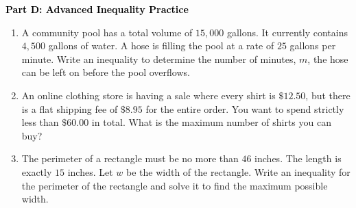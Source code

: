 \documentclass[12pt, letterpaper, fleqn]{article}
\begin{document}
\newpage

\begin{tcolorbox}[colback=customteal!20]
\large\textcolor{black}{\textbf{Part D: Advanced Inequality Practice}}
\end{tcolorbox}

\vspace{3mm}

\begin{enumerate}[itemsep=5.5cm, leftmargin=0.6cm, resume]
\item A community pool has a total volume of $15,000$ gallons. It currently contains $4,500$ gallons of water. A hose is filling the pool at a rate of $25$ gallons per minute. Write an inequality to determine the number of minutes, $m$, the hose can be left on before the pool overflows.
\item An online clothing store is having a sale where every shirt is $\$12.50$, but there is a flat shipping fee of $\$8.95$ for the entire order. You want to spend strictly less than $\$60.00$ in total. What is the maximum number of shirts you can buy?
\item The perimeter of a rectangle must be no more than $46$ inches. The length is exactly $15$ inches. Let $w$ be the width of the rectangle. Write an inequality for the perimeter of the rectangle and solve it to find the maximum possible width.
\end{enumerate}
\end{document}
